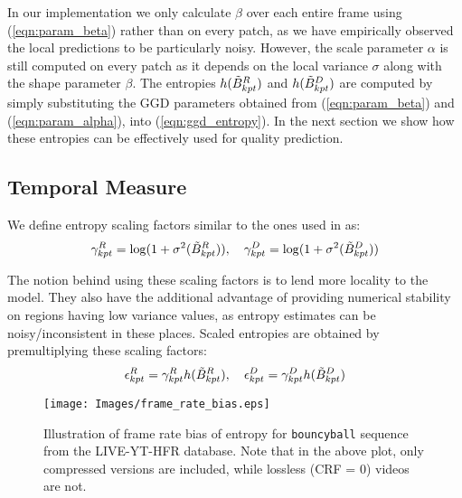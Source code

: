 \documentclass[journal]{IEEEtran}
\begin{document}
In our implementation we only calculate $\beta$ over each entire frame using (\ref{eqn:param_beta}) rather than on every patch, as we have empirically observed the local predictions to be particularly noisy. However, the scale parameter $\alpha$ is still computed on every patch as it depends on the local variance $\sigma$ along with the shape parameter $\beta$. The entropies $h(\Tilde{B}_{kpt}^R)$ and $h(\Tilde{B}_{kpt}^D)$ are computed by simply substituting the GGD parameters obtained from (\ref{eqn:param_beta}) and (\ref{eqn:param_alpha}), into (\ref{eqn:ggd_entropy}). In the next section we show how these entropies can be effectively used for quality prediction.

\subsection{Temporal Measure}
We define entropy scaling factors similar to the ones used in \cite{soundararajan2012rred,soundararajan2012video} as:
\begin{align*}
    \gamma_{kpt} ^R = \log(1+\sigma^2(\Tilde{B}_{kpt}^R)), \quad \gamma_{kpt}^D = \log(1+\sigma^2(\Tilde{B}_{kpt}^D))
\end{align*}

The notion behind using these scaling factors is to lend more locality to the model. They also have the additional advantage of providing numerical stability on regions having low variance values, as entropy estimates can be noisy/inconsistent in these places. Scaled entropies are obtained by premultiplying these scaling factors:
\begin{align}
    \epsilon_{kpt} ^R = \gamma_{kpt} ^R h(\Tilde{B}_{kpt}^R), \quad \epsilon_{kpt} ^D = \gamma_{kpt} ^D h(\Tilde{B}_{kpt}^D)
    \label{eqn:temporal_scaled_entropy}
\end{align}

\begin{figure}
    \centering
    \texttt{[image: Images/frame\_rate\_bias.eps]}
    \caption{Illustration of frame rate bias of entropy for \texttt{bouncyball} sequence from the LIVE-YT-HFR database. Note that in the above plot, only compressed versions are included, while lossless (CRF = 0) videos are not.}
    \label{fig:frame_rate_bias}
\end{figure}
\end{document}
